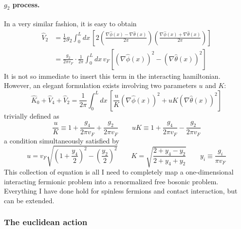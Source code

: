 \paragraph{$g_2$ process.} In a very similar fashion, it is easy to obtain
\[
\begin{aligned}
	\hat V_2 &= \frac{1}{2} g_2 \int_0^L dx \, \left[ 2 \left( \frac{\nabla \hat \phi(x) - \nabla \hat \theta(x)}{2\pi} \right) \left( \frac{\nabla \hat \phi(x) + \nabla \hat \theta(x)}{2\pi} \right) \right] \\
	&= \frac{g_2}{2\pi v_F} \cdot \frac{1}{2\pi} \int_0^L dx \, v_F \left[ \left( \nabla \hat \phi(x) \right)^2 - \left( \nabla \hat \theta(x) \right)^2 \right]
\end{aligned}
\]
It is not so immediate to insert this term in the interacting hamiltonian. However, an elegant formulation exists involving two parameters $u$ and $K$:
\begin{equation}\label{eq:interacting-fields-hamiltonian}
	\hat K_0 + \hat V_4 + \hat V_2 = \frac{1}{2\pi} \int_0^L dx \, \left[ \frac{u}{K} \left( \nabla \hat \phi(x) \right)^2 + uK \left( \nabla \hat \theta(x) \right)^2 \right]
\end{equation}
trivially defined as
\[
	\frac{u}{K} \equiv 1 + \frac{g_4}{2\pi v_F} + \frac{g_2}{2\pi v_F}
	\qquad
	uK \equiv 1 + \frac{g_4}{2\pi v_F} - \frac{g_2}{2\pi v_F}
\]
a condition simultaneously satisfied by
\[
	u = v_F \sqrt{\left(1 + \frac{y_4}{2}\right)^2 - \left(\frac{y_2}{2}\right)^2}
	\qquad
	K = \sqrt{\frac{2 + y_4 - y_2}{2 + y_4 + y_2}}
	\qquad
	y_i \equiv \frac{g_i}{\pi v_F}
\]
This collection of equation is all I need to completely map a one-dimensional interacting fermionic problem into a renormalized free bosonic problem. Everything I have done hold for spinless fermions and contact interaction, but can be extended.

\subsubsection{The euclidean action}

